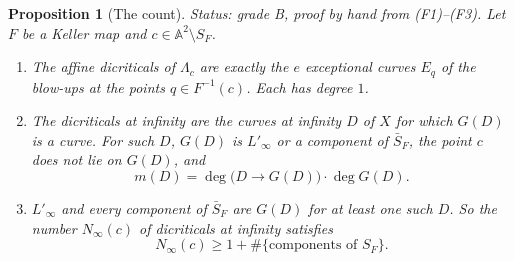 \documentclass[a4paper,11pt]{article}
\theoremstyle{jsplain}
\newtheorem{proposition}[theorem]{Proposition}
\theoremstyle{jsdef}
\theoremstyle{jsrem}
\begin{document}
\begin{proposition}[The count]\label{td:prop:count}
\textit{Status: grade B, proof by hand from \textnormal{(F1)--(F3)}.}
Let $F$ be a Keller map and $c \in \mathbb{A}^2 \setminus S_F$.
\begin{enumerate}[label=(\alph*),nosep]
\item The affine dicriticals of $\Lambda_c$ are exactly the $e$ exceptional curves $E_q$ of
the blow-ups at the points $q \in F^{-1}(c)$. Each has degree $1$.
\item The dicriticals at infinity are the curves at infinity $D$ of $X$ for which $G(D)$ is a
curve. For such $D$, $G(D)$ is $L'_\infty$ or a component of $\bar{S}_F$, the point $c$ does
not lie on $G(D)$, and
\begin{equation}\label{td:eq:count-degree}
m(D) = \deg\big(D \to G(D)\big) \cdot \deg G(D).
\end{equation}
\item $L'_\infty$ and every component of $\bar{S}_F$ are $G(D)$ for at least one such $D$.
So the number $N_\infty(c)$ of dicriticals at infinity satisfies
\begin{equation}\label{td:eq:count-lower}
N_\infty(c) \geq 1 + \#\{\text{components of } S_F\}.
\end{equation}
\end{enumerate}
\end{proposition}
\end{document}
